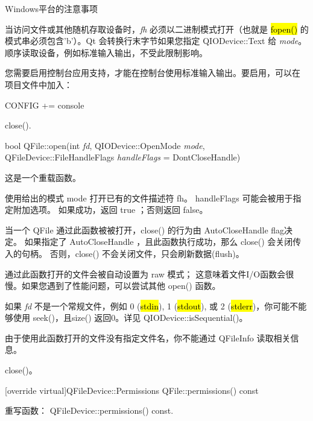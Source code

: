 Windows平台的注意事项

当访问文件或其他随机存取设备时，\emph{fh} 必须以二进制模式打开（也就是
\hl{fopen()} 的模式串必须包含'b'）。Qt 会转换行末字节如果您指定
QIODevice::Text 给 \emph{
mode}。顺序读取设备，例如标准输入输出，不受此限制影响。

您需要启用控制台应用支持，才能在控制台使用标准输入输出。要启用，可以在
项目文件中加入：

\begin{cppcode}
CONFIG += console
\end{cppcode}

\begin{seeAlso}
close().
\end{seeAlso}

bool QFile::open(int \emph{fd}, QIODevice::OpenMode \emph{mode}, QFileDevice::FileHandleFlags 
\emph{handleFlags} = DontCloseHandle)

这是一个重载函数。

使用给出的模式 mode 打开已有的文件描述符 fh。
handleFlags 可能会被用于指定附加选项。
如果成功，返回 true ；否则返回 false。

当一个 QFile 通过此函数被被打开，close() 的行为由 AutoCloseHandle flag决定。
如果指定了 AutoCloseHandle ，且此函数执行成功，那么 close() 会关闭传入的句柄。
否则，close() 不会关闭文件，只会刷新数据(flush)。

通过此函数打开的文件会被自动设置为 raw 模式；
这意味着文件I/O函数会很慢。如果您遇到了性能问题，可以尝试其他 open() 函数。

\begin{warning}

\end{warning} 

\begin{compactitem}
\item 如果 \emph{fd} 不是一个常规文件，例如 0 (\hl{stdin}), 1 (\hl{stdout}), 或 2 (\hl{stderr})，你可能不能够使用 seek()，且size() 返回0。详见 QIODevice::isSequential()。
\item 由于使用此函数打开的文件没有指定文件名，你不能通过 QFileInfo 读取相关信息。
\end{compactitem}


\begin{seeAlso}
 close()。
\end{seeAlso}

[override virtual]QFileDevice::Permissions QFile::permissions() const

重写函数： QFileDevice::permissions() const.


